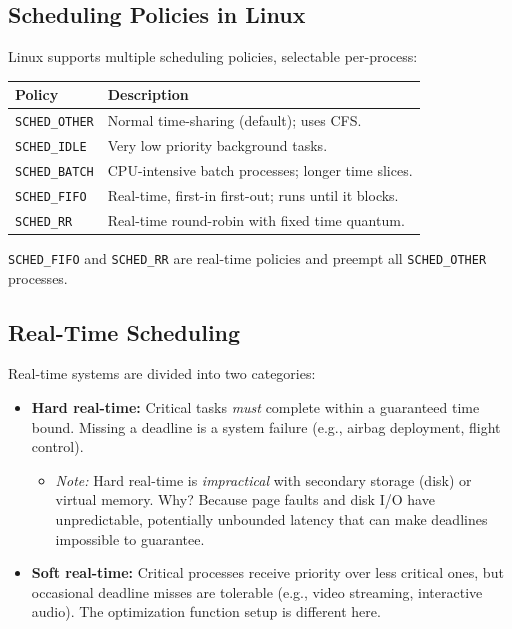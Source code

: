 \documentclass[11pt]{article}
\begin{document}
\subsection{Scheduling Policies in Linux}

Linux supports multiple scheduling policies, selectable per-process:

\begin{center}
\begin{tabular}{ll}
\toprule
\textbf{Policy} & \textbf{Description} \\
\midrule
\texttt{SCHED\_OTHER} & Normal time-sharing (default); uses CFS. \\
\texttt{SCHED\_IDLE}  & Very low priority background tasks. \\
\texttt{SCHED\_BATCH} & CPU-intensive batch processes; longer time slices. \\
\texttt{SCHED\_FIFO}  & Real-time, first-in first-out; runs until it blocks. \\
\texttt{SCHED\_RR}    & Real-time round-robin with fixed time quantum. \\
\bottomrule
\end{tabular}
\end{center}

\texttt{SCHED\_FIFO} and \texttt{SCHED\_RR} are real-time policies and preempt all \texttt{SCHED\_OTHER} processes.

\subsection{Real-Time Scheduling}

Real-time systems are divided into two categories:

\begin{itemize}
    \item \textbf{Hard real-time:} Critical tasks \emph{must} complete within a guaranteed time bound. Missing a deadline is a system failure (e.g., airbag deployment, flight control).
    \begin{itemize}
        \item \emph{Note:} Hard real-time is \emph{impractical} with secondary storage (disk) or virtual memory. Why? Because page faults and disk I/O have unpredictable, potentially unbounded latency that can make deadlines impossible to guarantee.
    \end{itemize}
    \item \textbf{Soft real-time:} Critical processes receive priority over less critical ones, but occasional deadline misses are tolerable (e.g., video streaming, interactive audio). The optimization function setup is different here.
\end{itemize}
\end{document}
